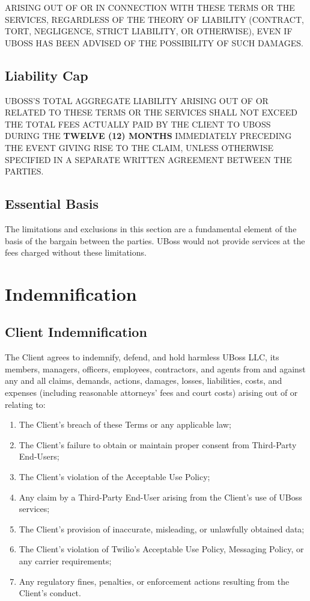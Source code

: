 \documentclass[11pt,letterpaper,parskip=half]{scrartcl}
\begin{document}
ARISING OUT OF OR IN CONNECTION WITH THESE TERMS OR THE SERVICES, REGARDLESS OF THE THEORY OF LIABILITY (CONTRACT, TORT, NEGLIGENCE, STRICT LIABILITY, OR OTHERWISE), EVEN IF UBOSS HAS BEEN ADVISED OF THE POSSIBILITY OF SUCH DAMAGES.

\subsection{Liability Cap}

UBOSS'S TOTAL AGGREGATE LIABILITY ARISING OUT OF OR RELATED TO THESE TERMS OR THE SERVICES SHALL NOT EXCEED THE TOTAL FEES ACTUALLY PAID BY THE CLIENT TO UBOSS DURING THE \textbf{TWELVE (12) MONTHS} IMMEDIATELY PRECEDING THE EVENT GIVING RISE TO THE CLAIM, UNLESS OTHERWISE SPECIFIED IN A SEPARATE WRITTEN AGREEMENT BETWEEN THE PARTIES.

\subsection{Essential Basis}

The limitations and exclusions in this section are a fundamental element of the basis of the bargain between the parties. UBoss would not provide services at the fees charged without these limitations.

\section{Indemnification}

\subsection{Client Indemnification}

The Client agrees to indemnify, defend, and hold harmless UBoss LLC, its members, managers, officers, employees, contractors, and agents from and against any and all claims, demands, actions, damages, losses, liabilities, costs, and expenses (including reasonable attorneys' fees and court costs) arising out of or relating to:

\begin{enumerate}[nosep, leftmargin=1.5em]
    \item The Client's breach of these Terms or any applicable law;
    \item The Client's failure to obtain or maintain proper consent from Third-Party End-Users;
    \item The Client's violation of the Acceptable Use Policy;
    \item Any claim by a Third-Party End-User arising from the Client's use of UBoss services;
    \item The Client's provision of inaccurate, misleading, or unlawfully obtained data;
    \item The Client's violation of Twilio's Acceptable Use Policy, Messaging Policy, or any carrier requirements;
    \item Any regulatory fines, penalties, or enforcement actions resulting from the Client's conduct.
\end{enumerate}
\end{document}
